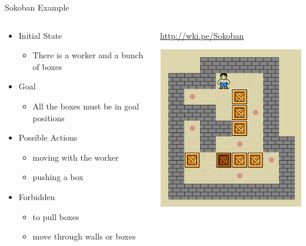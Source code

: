 \documentclass[t]{sdqbeamer}
\begin{document}
\begin{frame}{Sokoban Example}
\begin{columns}
\begin{column}{0.5\textwidth}
\begin{itemize}
	\item Initial State
	\begin{itemize}
	\item There is a worker and a bunch of boxes
	\end{itemize}
	\item Goal
	\begin{itemize}
	\item All the boxes must be in goal positions
	\end{itemize}
	\item Possible Actions
	\begin{itemize}
	\item moving with the worker
	\item pushing a box
	\end{itemize}
	\item Forbidden
	\begin{itemize}
	\item to pull boxes
	\item move through walls or boxes
	\end{itemize}
\end{itemize}
\end{column}
\begin{column}{0.5\textwidth}
\url{http://wki.pe/Sokoban}

\includegraphics[scale=0.45]{figures/l10/sokoban.png}
\end{column}
\end{columns}
\end{frame}
\end{document}

